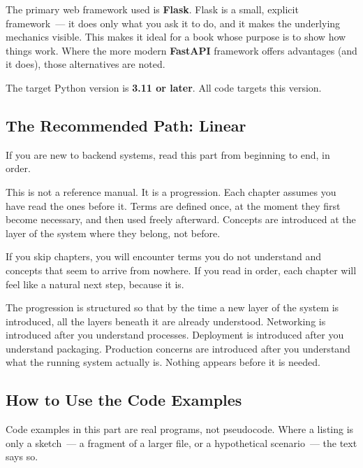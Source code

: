 The primary web framework used is \textbf{Flask}. Flask is a small, explicit framework~--- it does only what you ask it to do, and it makes the underlying mechanics visible. This makes it ideal for a book whose purpose is to show how things work. Where the more modern \textbf{FastAPI} framework offers advantages (and it does), those alternatives are noted.

The target Python version is \textbf{3.11 or later}. All code targets this version.

\label{part4-introduction:how-to-read-this-part}

\subsection*{The Recommended Path: Linear}\label{part4-introduction:the-recommended-path-linear}

If you are new to backend systems, read this part from beginning to end, in order.

This is not a reference manual. It is a progression. Each chapter assumes you have read the ones before it. Terms are defined once, at the moment they first become necessary, and then used freely afterward. Concepts are introduced at the layer of the system where they belong, not before.

If you skip chapters, you will encounter terms you do not understand and concepts that seem to arrive from nowhere. If you read in order, each chapter will feel like a natural next step, because it is.

The progression is structured so that by the time a new layer of the system is introduced, all the layers beneath it are already understood. Networking is introduced after you understand processes. Deployment is introduced after you understand packaging. Production concerns are introduced after you understand what the running system actually is. Nothing appears before it is needed.

\subsection*{How to Use the Code Examples}\label{part4-introduction:how-to-use-the-code-examples}

Code examples in this part are real programs, not pseudocode. Where a listing is only a sketch~--- a fragment of a larger file, or a hypothetical scenario~--- the text says so.

